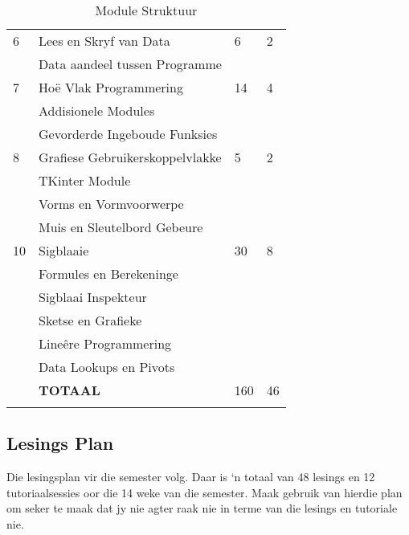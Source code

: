 \begin{longtable}{|p{2.0cm}|p{7.6cm}|p{2.0cm}|p{1.8cm}|}
             \hline
             6  & Lees en Skryf van Data                       &  6 & 2  \\
                & \qquad Data aandeel tussen Programme         &    &    \\
             \hline
             7  & Ho\"{e} Vlak Programmering                   & 14 & 4  \\
                & \qquad Addisionele Modules                   &    &    \\
                & \qquad Gevorderde Ingeboude Funksies         &    &    \\
             \hline
             8  & Grafiese Gebruikerskoppelvlakke              &  5 & 2  \\
                & \qquad TKinter Module                        &    &    \\
                & \qquad Vorms en Vormvoorwerpe                &    &    \\
                & \qquad Muis en Sleutelbord Gebeure           &    &    \\
             \hline
             10 & Sigblaaie                                    & 30 & 8  \\
                & \qquad Formules en Berekeninge               &    &    \\
                & \qquad Sigblaai Inspekteur                   &    &    \\
                & \qquad Sketse en Grafieke                    &    &    \\
                & \qquad Line\^{e}re Programmering             &    &    \\
                & \qquad Data Lookups en Pivots                &    &    \\
             \hline
                & {\bf TOTAAL}                                 &160 & 46 \\
             \hline
            \caption[Module Struktuur]{Module Struktuur} \label{tab:study_comp}
        \end{longtable}

    \subsection{Lesings Plan}
        Die lesingsplan vir die semester volg. Daar is `n totaal van 48
        lesings en 12 tutoriaalsessies oor die 14 weke van die semester. Maak
        gebruik van hierdie plan om seker te maak dat jy nie agter raak nie in
        terme van die lesings en tutoriale nie.


